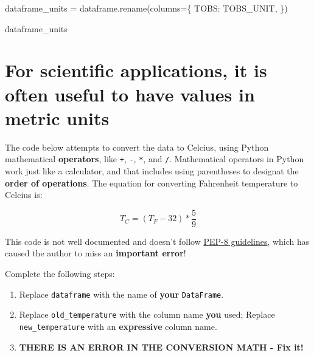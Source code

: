 \documentclass[
  letterpaper,
  DIV=11,
  numbers=noendperiod,
  oneside]{scrreprt}
\newenvironment{Shaded}{\begin{snugshade}}{\end{snugshade}}
\newcommand{\NormalTok}[1]{\textcolor[rgb]{0.00,0.23,0.31}{#1}}
\newcommand{\OperatorTok}[1]{\textcolor[rgb]{0.37,0.37,0.37}{#1}}
\newcommand{\StringTok}[1]{\textcolor[rgb]{0.13,0.47,0.30}{#1}}
\providecommand{\tightlist}{%
  \setlength{\itemsep}{0pt}\setlength{\parskip}{0pt}}
\begin{document}
\begin{Shaded}
\begin{Highlighting}[]
\NormalTok{dataframe\_units }\OperatorTok{=}\NormalTok{ dataframe.rename(columns}\OperatorTok{=}\NormalTok{\{}
    \StringTok{\textquotesingle{}TOBS\textquotesingle{}}\NormalTok{: }\StringTok{\textquotesingle{}TOBS\_UNIT\textquotesingle{}}\NormalTok{,}
\NormalTok{\})}

\NormalTok{dataframe\_units}
\end{Highlighting}
\end{Shaded}

\section{For scientific applications, it is often useful to have values
in metric
units}\label{for-scientific-applications-it-is-often-useful-to-have-values-in-metric-units}

\begin{tcolorbox}[enhanced jigsaw, colbacktitle=quarto-callout-color!10!white, opacityback=0, bottomtitle=1mm, toptitle=1mm, bottomrule=.15mm, left=2mm, colframe=quarto-callout-color-frame, leftrule=.75mm, opacitybacktitle=0.6, colback=white, rightrule=.15mm, toprule=.15mm, breakable, titlerule=0mm, title=\textcolor{quarto-callout-color}{\faInfo}\hspace{0.5em}{Try It: Convert units}, coltitle=black, arc=.35mm]

The code below attempts to convert the data to Celcius, using Python
mathematical \textbf{operators}, like \texttt{+}, \texttt{-},
\texttt{*}, and \texttt{/}. Mathematical operators in Python work just
like a calculator, and that includes using parentheses to designat the
\textbf{order of operations}. The equation for converting Fahrenheit
temperature to Celcius is:

\[ T_C = (T_F - 32) * \frac{5}{9} \]

This code is not well documented and doesn't follow
\href{https://peps.python.org/pep-0008/\#other-recommendations}{PEP-8
guidelines}, which has caused the author to miss an \textbf{important
error}!

Complete the following steps:

\begin{enumerate}
\def\labelenumi{\arabic{enumi}.}
\tightlist
\item
  Replace \texttt{dataframe} with the name of \textbf{your}
  \texttt{DataFrame}.
\item
  Replace \texttt{\textquotesingle{}old\_temperature\textquotesingle{}}
  with the column name \textbf{you} used; Replace
  \texttt{\textquotesingle{}new\_temperature\textquotesingle{}} with an
  \textbf{expressive} column name.
\item
  \textbf{THERE IS AN ERROR IN THE CONVERSION MATH - Fix it!}
\end{enumerate}

\end{tcolorbox}
\end{document}
